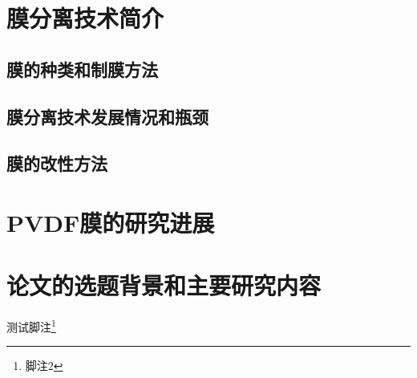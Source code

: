 \section{膜分离技术简介}
\subsection{膜的种类和制膜方法}
\subsection{膜分离技术发展情况和瓶颈}
\subsection{膜的改性方法}

\section{PVDF膜的研究进展}

\section{论文的选题背景和主要研究内容}

测试脚注\footnote{脚注2}
